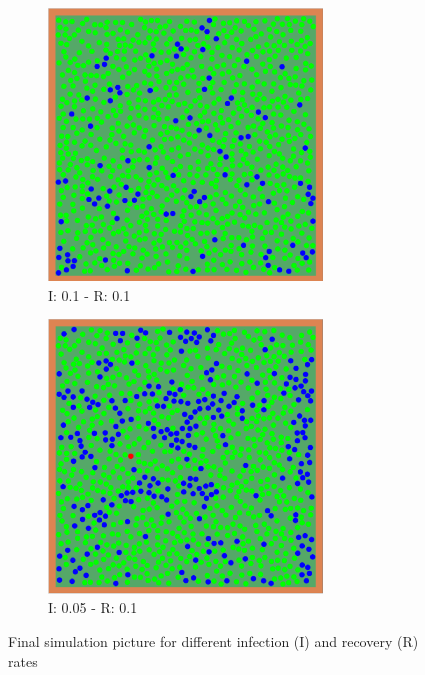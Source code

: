 \begin{figure}[H]
\begin{subfigure}[b]{0.4\textwidth}
      \centering
     \includegraphics[width=0.8\textwidth]{images/2-51c.png}
     \caption{I: 0.1 - R: 0.1}
     \label{fig: 51c}
 \end{subfigure}
 \begin{subfigure}[b]{0.4\textwidth}
      \centering
     \includegraphics[width=0.8\textwidth]{images/2-51d.png}
     \caption{I: 0.05 - R: 0.1}
     \label{fig: 51d}
 \end{subfigure}
 \caption{Final simulation picture for different infection (I) and recovery (R) rates}
 \label{fig: 51ad}
\end{figure}

